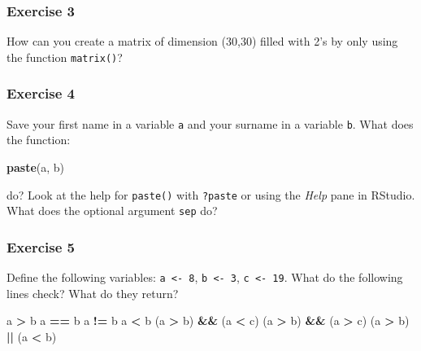 \documentclass[]{gitbook}
\newenvironment{Shaded}{\begin{snugshade}}{\end{snugshade}}
\newcommand{\KeywordTok}[1]{\textcolor[rgb]{0.13,0.29,0.53}{\textbf{#1}}}
\newcommand{\NormalTok}[1]{#1}
\newcommand{\OperatorTok}[1]{\textcolor[rgb]{0.81,0.36,0.00}{\textbf{#1}}}
\newcommand{\StringTok}[1]{\textcolor[rgb]{0.31,0.60,0.02}{#1}}
\theoremstyle{definition}
\theoremstyle{definition}
\theoremstyle{definition}
\theoremstyle{remark}
\begin{document}
\hypertarget{exercise-3}{%
\subsubsection*{Exercise 3}\label{exercise-3}}

How can you create a matrix of dimension (30,30) filled with 2's by only
using the function \texttt{matrix()}?

\hypertarget{exercise-4}{%
\subsubsection*{Exercise 4}\label{exercise-4}}

Save your first name in a variable \texttt{a} and your surname in a
variable \texttt{b}. What does the function:

\begin{Shaded}
\begin{Highlighting}[]
\KeywordTok{paste}\NormalTok{(a, b)}
\end{Highlighting}
\end{Shaded}

do? Look at the help for \texttt{paste()} with \texttt{?paste} or using
the \emph{Help} pane in RStudio. What does the optional argument
\texttt{sep} do?

\hypertarget{exercise-5}{%
\subsubsection*{Exercise 5}\label{exercise-5}}

Define the following variables: \texttt{a\ \textless{}-\ 8},
\texttt{b\ \textless{}-\ 3}, \texttt{c\ \textless{}-\ 19}. What do the
following lines check? What do they return?

\begin{Shaded}
\begin{Highlighting}[]
\NormalTok{a }\OperatorTok{>}\StringTok{ }\NormalTok{b}
\NormalTok{a }\OperatorTok{==}\StringTok{ }\NormalTok{b}
\NormalTok{a }\OperatorTok{!=}\StringTok{ }\NormalTok{b}
\NormalTok{a }\OperatorTok{<}\StringTok{ }\NormalTok{b}
\NormalTok{(a }\OperatorTok{>}\StringTok{ }\NormalTok{b) }\OperatorTok{&&}\StringTok{ }\NormalTok{(a }\OperatorTok{<}\StringTok{ }\NormalTok{c)}
\NormalTok{(a }\OperatorTok{>}\StringTok{ }\NormalTok{b) }\OperatorTok{&&}\StringTok{ }\NormalTok{(a }\OperatorTok{>}\StringTok{ }\NormalTok{c)}
\NormalTok{(a }\OperatorTok{>}\StringTok{ }\NormalTok{b) }\OperatorTok{||}\StringTok{ }\NormalTok{(a }\OperatorTok{<}\StringTok{ }\NormalTok{b)}
\end{Highlighting}
\end{Shaded}
\end{document}
